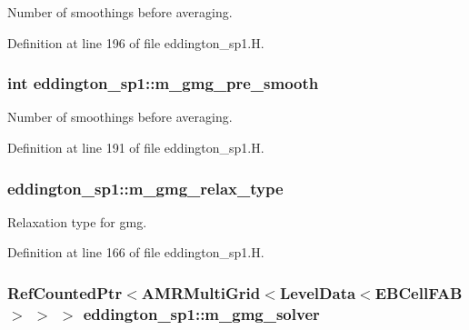 Number of smoothings before averaging. 



Definition at line 196 of file eddington\+\_\+sp1.\+H.

\subsubsection[{\texorpdfstring{m\+\_\+gmg\+\_\+pre\+\_\+smooth}{m_gmg_pre_smooth}}]{\setlength{\rightskip}{0pt plus 5cm}int eddington\+\_\+sp1\+::m\+\_\+gmg\+\_\+pre\+\_\+smooth\hspace{0.3cm}{\ttfamily [protected]}}\hypertarget{classeddington__sp1_a157abefad919cf453a00384302d141cd}{}\label{classeddington__sp1_a157abefad919cf453a00384302d141cd}


Number of smoothings before averaging. 



Definition at line 191 of file eddington\+\_\+sp1.\+H.

\subsubsection[{\texorpdfstring{m\+\_\+gmg\+\_\+relax\+\_\+type}{m_gmg_relax_type}}]{ eddington\+\_\+sp1\+::m\+\_\+gmg\+\_\+relax\+\_\+type\hspace{0.3cm}{\ttfamily [protected]}}\hypertarget{classeddington__sp1_af98b7ae31d33b6111551f857cae4b47b}{}\label{classeddington__sp1_af98b7ae31d33b6111551f857cae4b47b}


Relaxation type for gmg. 



Definition at line 166 of file eddington\+\_\+sp1.\+H.

\subsubsection[{\texorpdfstring{m\+\_\+gmg\+\_\+solver}{m_gmg_solver}}]{\setlength{\rightskip}{0pt plus 5cm}Ref\+Counted\+Ptr$<$A\+M\+R\+Multi\+Grid$<$Level\+Data$<$E\+B\+Cell\+F\+AB$>$ $>$ $>$ eddington\+\_\+sp1\+::m\+\_\+gmg\+\_\+solver\hspace{0.3cm}{\ttfamily [protected]}}\hypertarget{classeddington__sp1_ab74a65fb54205fe06bae9de1db3deb46}{}\label{classeddington__sp1_ab74a65fb54205fe06bae9de1db3deb46}



